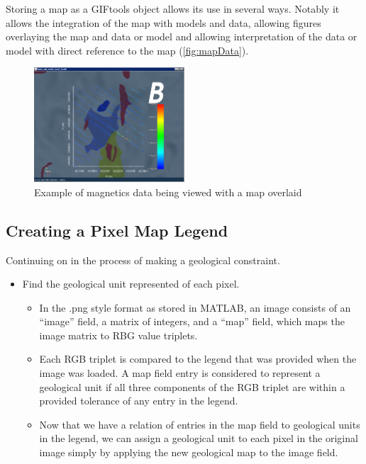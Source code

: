 Storing a map as a GIFtools object allows its use in several ways. Notably it allows the integration of the map with models and data, allowing figures overlaying the map and data or model and allowing interpretation of the data or model with direct reference to the map (\autoref{fig:mapData}).
\begin{figure} [h]
    \centering
    \includegraphics[width=0.5\textwidth]{images/MaptoModel/mapData.PNG}
    \caption{Example of magnetics data being viewed with a map overlaid }
    \label{fig:mapData}
\end{figure}



\subsection{Creating a Pixel Map Legend}
\label{subsec:Create Pixel Map Legend}

Continuing on in the process of making a geological constraint.
\begin{itemize}
\item Find the geological unit represented of each pixel.
\begin{itemize}
	\item In the .png style format as stored in MATLAB, an image consists of an ``image'' field, a matrix of integers, and a ``map'' field, which maps the image matrix to RBG value triplets.
	\item Each RGB triplet is compared to the legend that was provided when the image was loaded. A map field entry is considered to represent a geological unit if all three components of the RGB triplet are within a provided tolerance of any entry in the legend.
	\item Now that we have a relation of entries in the map field to geological units in the legend, we can assign a geological unit to each pixel in the original image simply by applying the new geological map to the image field.
\end{itemize}
\end{itemize}

